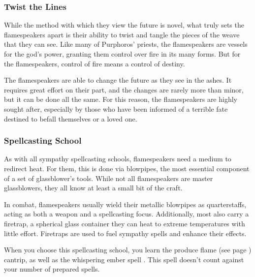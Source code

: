     \subsubsection{Twist the Lines}
        While the method with which they view the future is novel, what truly sets the flamespeakers apart is their ability to twist and tangle the pieces of the weave that they can see.
        Like many of Purphoros' priests, the flamespeakers are vessels for the god's power, granting them control over fire in its many forms.
        But for the flamespeakers, control of fire means a control of destiny.

        The flamespeakers are able to change the future as they see in the ashes.
        It requires great effort on their part, and the changes are rarely more than minor, but it can be done all the same.
        For this reason, the flamespeakers are highly sought after, especially by those who have been informed of a terrible fate destined to befall themselves or a loved one.

    \subsubsection{Spellcasting School}
        As with all sympathy spellcasting schools, flamespeakers need a medium to redirect heat.
        For them, this is done via blowpipes, the most essential component of a set of glassblower's tools.
        While not all flamespeakers are master glassblowers, they all know at least a small bit of the craft.

        In combat, flamespeakers usually wield their metallic blowpipes as quarterstaffs, acting as both a weapon and a spellcasting focus.
        Additionally, most also carry a firetrap, a spherical glass container they can heat to extreme temperatures with little effort. %
        Firetraps are used to fuel sympathy spells and enhance their effects.

        When you choose this spellcasting school, you learn the produce flame (see page \pageref{spell::produceflame}) cantrip, as well as the whispering ember spell \pageref{spell::whisperingember}.
        This spell doesn't count against your number of prepared spells.
